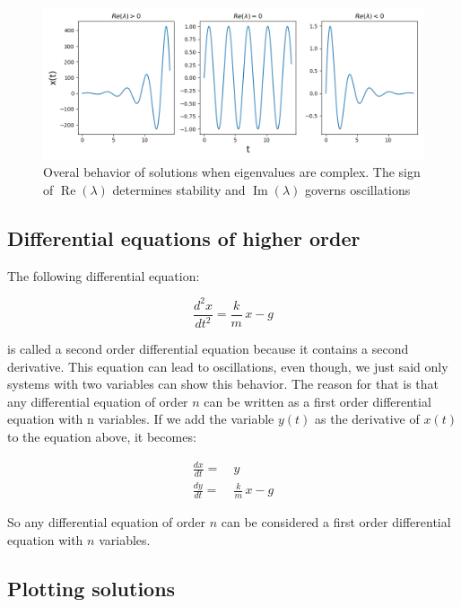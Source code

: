 \documentclass{tufte-book} %
\begin{document}
\begin{figure}
	\begin{center}
		\includegraphics[width=\textwidth]{complex_eigen}
	\end{center}
	\caption{Overal behavior of solutions when eigenvalues are complex. The sign of $\operatorname{Re}(\lambda)$ determines stability and $\operatorname{Im}(\lambda)$ governs oscillations}
	\label{fig:cmplxeigen}
\end{figure}


\FloatBarrier

\subsection{Differential equations of higher order}

The following differential equation:

\begin{equation}
	 \frac{d^2x}{dt^2} = \frac{k}{m} \, x - g \nonumber
\end{equation}

is called a second order differential equation because it contains a second derivative. This equation can lead to oscillations, even though, we just said only systems with two variables can show this behavior. The reason for that is that any  differential equation of order $n$ can be written as a first order differential equation with n variables. If we add the variable $y(t)$ as the derivative of $x(t)$ to the equation above, it becomes:

\begin{align}
	\frac{dx}{dt} =& \: y \nonumber \\
	\frac{dy}{dt} =& \: \frac{k}{m} \, x - g \nonumber
\end{align}

So any differential equation of order $n$ can be considered a first order differential equation with $n$ variables.

\subsection{Plotting solutions}
\end{document}
